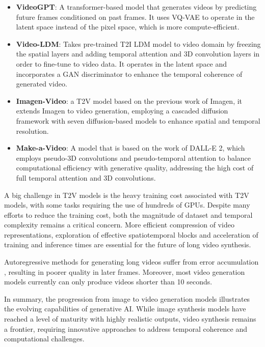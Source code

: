 \begin{itemize}
    \item \textbf{VideoGPT}: A transformer-based model that generates videos by predicting future frames conditioned on past frames. It uses VQ-VAE to operate in the latent space instead of the pixel space, which is more compute-efficient.
    
    \item \textbf{Video-LDM}: Takes pre-trained T2I LDM model to video domain by freezing the spatial layers and adding temporal attention and 3D convolution layers in order to fine-tune to video data. It operates in the latent space and incorporates a GAN discriminator to enhance the temporal coherence of generated video.
    
    \item \textbf{Imagen-Video}: a T2V model based on the previous work of Imagen, it extends Imagen to video generation, employing a cascaded diffusion framework with seven diffusion-based models to enhance spatial and temporal resolution.
    
    \item \textbf{Make-a-Video}: A model that is based on the work of DALL-E 2, which employs pseudo-3D convolutions and pseudo-temporal attention to balance computational efficiency with generative quality, addressing the high cost of full temporal attention and 3D convolutions.
\end{itemize}

A big challenge in T2V models is the heavy training cost associated with T2V models, with some tasks requiring the use of hundreds of GPUs. Despite many efforts to reduce the training cost, both the magnitude of dataset and temporal complexity remains a critical concern. More efficient compression of video representations, exploration of effective spatiotemporal blocks and acceleration of training and inference times are essential for the future of long video synthesis.

Autoregressive methods for generating long videos suffer from error accumulation \cite{ouyang2024flexifilm}, resulting in poorer quality in later frames. Moreover, most video generation models currently can only produce videos shorter than 10 seconds.

In summary, the progression from image to video generation models illustrates the evolving capabilities of generative AI. While image synthesis models have reached a level of maturity with highly realistic outputs, video synthesis remains a frontier, requiring innovative approaches to address temporal coherence and computational challenges.